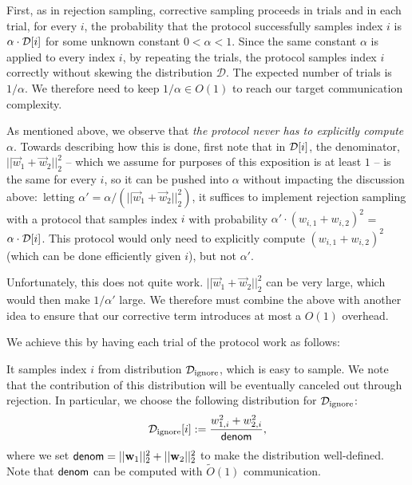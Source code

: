 First, as in rejection sampling, corrective
sampling proceeds in trials and
in each trial, for every $i$, the probability that the protocol
successfully samples index $i$ is $\alpha \cdot {\cal D}[i]$ for some unknown constant $0 <
\alpha < 1$. 
Since the same constant $\alpha$ is applied to every index $i$, by
repeating the trials, the protocol samples index $i$ correctly without
skewing the distribution $\mathcal{D}$. The expected number of trials is
$1/\alpha$. We therefore need to keep $1/\alpha \in {O}(1)$ to reach our target communication complexity.

As mentioned above, we observe that {\em the protocol never has to
explicitly compute $\alpha$}. Towards describing how this is done, first note that in ${\cal D}[i]$, the
denominator, $||\vec{w}_1 + \vec{w}_2||_2^2$ -- which we assume for purposes of this exposition is at least $1$ -- is the same for every $i$,
so it can be pushed into $\alpha$ without 
impacting the discussion above:~letting 
 $\alpha' = \alpha/(||\vec{w}_1 + \vec{w}_2||_2^2)$, it suffices to implement rejection sampling with a protocol that samples index $i$ with probability 
$\alpha'\cdot (w_{i,1} + w_{i,2})^2$ = $\alpha \cdot {\cal D}[i]$.
This protocol would only need to explicitly compute 
$(w_{i,1} + w_{i,2})^2$ (which can be done efficiently
given $i$), but not $\alpha'$.

Unfortunately, this does not quite work.
$||\vec{w}_1 + \vec{w}_2||_2^2$ can be very large, which would then
make $1/\alpha'$ large. We therefore must combine the above with another idea to ensure that our corrective term introduces at most a ${O}(1)$ overhead. 

We achieve this by having each trial of the protocol work as follows:
\BEN
\item It samples index $i$ from distribution
$\mathcal{D}_{\mathrm{ignore}}$, which is easy to sample. We note that the contribution of this distribution will be eventually
canceled out through rejection.  In particular, we choose the following distribution for
$\mathcal{D}_{\mathrm{ignore}}$:
$${\cal D}_{\mathrm{ignore}}[i] := \frac{w^2_{1,i} + w^2_{2,i}}{\mathsf{denom}},$$
where we set $\mathsf{denom} = ||\mathbf{w}_1||_2^2 + ||\mathbf{w}_2||_2^2$ to make
the distribution well-defined.  Note that $\mathsf{denom}$ can be computed with $\tilde O(1)$ communication.


